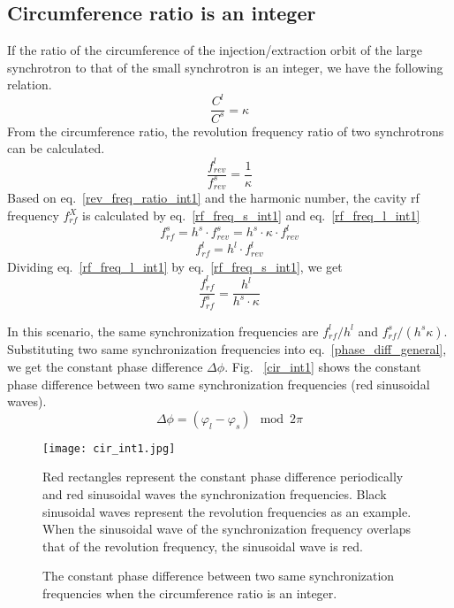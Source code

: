 \subsection{Circumference ratio is an integer}
\label{sec:cir_integer}
If the ratio of the circumference of the injection/extraction orbit of the large synchrotron to that of the small synchrotron is an integer, we have the following relation. 
\begin{equation}
\frac{C^l}{C^s}=\kappa \label{circumference_ratio_int1}
\end{equation}
From the circumference ratio, the revolution frequency ratio of two synchrotrons can be calculated.
\begin{equation}
\frac{f_{\mathit{rev}}^{l}}{f_{\mathit{rev}}^{s}}=\frac{1}{\kappa} \label{rev_freq_ratio_int1}
\end{equation}
Based on eq.~\ref{rev_freq_ratio_int1} and the harmonic number, the cavity rf frequency $f_{rf}^{X}$ is calculated by eq.~\ref{rf_freq_s_int1} and eq.~\ref{rf_freq_l_int1}
\begin{equation} 
f_{\mathit{rf}}^{s}= h^s \cdot f_{\mathit{rev}}^{s}=h^s \cdot \kappa \cdot f_{rev}^{l} \label{rf_freq_s_int1}
\end{equation}
\begin{equation} 
f_{\mathit{rf}}^{l}= h^l \cdot f_{\mathit{rev}}^{l} \label{rf_freq_l_int1}
\end{equation}
Dividing eq.~\ref{rf_freq_l_int1} by eq.~\ref{rf_freq_s_int1}, we get
\begin{equation} 
\frac{f_{\mathit{rf}}^{l}}{f_{\mathit{rf}}^{s}}= \frac{h^l}{h^s \cdot \kappa} \label{rf_freq_ratio1}
\end{equation}

In this scenario, the same synchronization frequencies are $f_{\mathit{rf}}^{l}/h^l $ and $f_{\mathit{rf}}^{s}/(h^{s}\kappa)$. Substituting two same synchronization frequencies into eq.~\ref{phase_diff_general}, we get the constant phase difference $\Delta \phi$. Fig. ~\ref{cir_int1} shows the constant phase difference between two same synchronization frequencies (red sinusoidal waves).
\begin{equation}
\label{phase_diff_cir_int}
	\Delta \phi=(\varphi_l-\varphi_s) \mod 2\pi
\end{equation}

\begin{figure}[!htb]
   \centering   
   \texttt{[image: cir\_int1.jpg]}
   \caption{The constant phase difference between two same synchronization frequencies when the circumference ratio is an integer.}{Red rectangles represent the constant phase difference periodically and red sinusoidal waves the synchronization frequencies. Black sinusoidal waves represent the revolution frequencies as an example. When the sinusoidal wave of the synchronization frequency overlaps that of the revolution frequency, the sinusoidal wave is red.}
   \label{cir_int}
\end{figure} 

